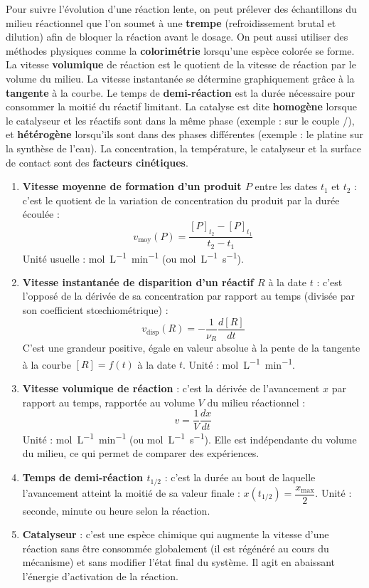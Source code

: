 \documentclass[11pt]{article}
\begin{document}
\begin{corrige}
Pour suivre l'évolution d'une réaction lente, on peut prélever des échantillons du milieu réactionnel que l'on soumet à une \textbf{trempe} (refroidissement brutal et dilution) afin de bloquer la réaction avant le dosage. On peut aussi utiliser des méthodes physiques comme la \textbf{colorimétrie} lorsqu'une espèce colorée se forme. La vitesse \textbf{volumique} de réaction est le quotient de la vitesse de réaction par le volume du milieu. La vitesse instantanée se détermine graphiquement grâce à la \textbf{tangente} à la courbe. Le temps de \textbf{demi-réaction} est la durée nécessaire pour consommer la moitié du réactif limitant. La catalyse est dite \textbf{homogène} lorsque le catalyseur et les réactifs sont dans la même phase (exemple :  sur le couple /), et \textbf{hétérogène} lorsqu'ils sont dans des phases différentes (exemple : le platine sur la synthèse de l'eau). La concentration, la température, le catalyseur et la surface de contact sont des \textbf{facteurs cinétiques}.
\end{corrige}

\begin{corrige}
\begin{enumerate}
\item \textbf{Vitesse moyenne de formation d'un produit $P$} entre les dates $t_1$ et $t_2$ : c'est le quotient de la variation de concentration du produit par la durée écoulée :
\[ v_{\text{moy}}(P) = \frac{[P]_{t_2} - [P]_{t_1}}{t_2 - t_1} \]
Unité usuelle : \si{mol.L^{-1}.min^{-1}} (ou \si{mol.L^{-1}.s^{-1}}).
\item \textbf{Vitesse instantanée de disparition d'un réactif $R$} à la date $t$ : c'est l'opposé de la dérivée de sa concentration par rapport au temps (divisée par son coefficient stœchiométrique) :
\[ v_{\text{disp}}(R) = -\frac{1}{\nu_R}\frac{d[R]}{dt} \]
C'est une grandeur positive, égale en valeur absolue à la pente de la tangente à la courbe $[R] = f(t)$ à la date $t$. Unité : \si{mol.L^{-1}.min^{-1}}.
\item \textbf{Vitesse volumique de réaction} : c'est la dérivée de l'avancement $x$ par rapport au temps, rapportée au volume $V$ du milieu réactionnel :
\[ v = \frac{1}{V}\frac{dx}{dt} \]
Unité : \si{mol.L^{-1}.min^{-1}} (ou \si{mol.L^{-1}.s^{-1}}). Elle est indépendante du volume du milieu, ce qui permet de comparer des expériences.
\item \textbf{Temps de demi-réaction $t_{1/2}$} : c'est la durée au bout de laquelle l'avancement atteint la moitié de sa valeur finale : $x(t_{1/2}) = \dfrac{x_{\max}}{2}$. Unité : seconde, minute ou heure selon la réaction.
\item \textbf{Catalyseur} : c'est une espèce chimique qui augmente la vitesse d'une réaction sans être consommée globalement (il est régénéré au cours du mécanisme) et sans modifier l'état final du système. Il agit en abaissant l'énergie d'activation de la réaction.
\end{enumerate}
\end{corrige}
\end{document}
